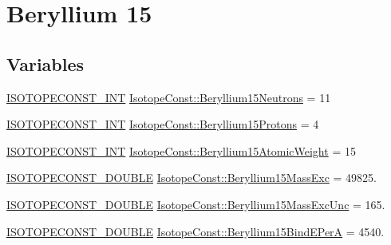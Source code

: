 \hypertarget{group___isotope_const-_beryllium-_be15}{}\section{Beryllium 15}
\label{group___isotope_const-_beryllium-_be15}
\subsection*{Variables}
\begin{DoxyCompactItemize}
\item 
\mbox{\hyperlink{group___isotope_const-_macros_ga5f18360b3e99483a35c32d789e62621c}{I\+S\+O\+T\+O\+P\+E\+C\+O\+N\+S\+T\+\_\+\+I\+NT}} \mbox{\hyperlink{group___isotope_const-_beryllium-_be15_ga1533d6149188ed36e13603113fab02f1}{Isotope\+Const\+::\+Beryllium15\+Neutrons}} = 11
\item 
\mbox{\hyperlink{group___isotope_const-_macros_ga5f18360b3e99483a35c32d789e62621c}{I\+S\+O\+T\+O\+P\+E\+C\+O\+N\+S\+T\+\_\+\+I\+NT}} \mbox{\hyperlink{group___isotope_const-_beryllium-_be15_ga3765d63df0bcdcb15f79ee29c2722708}{Isotope\+Const\+::\+Beryllium15\+Protons}} = 4
\item 
\mbox{\hyperlink{group___isotope_const-_macros_ga5f18360b3e99483a35c32d789e62621c}{I\+S\+O\+T\+O\+P\+E\+C\+O\+N\+S\+T\+\_\+\+I\+NT}} \mbox{\hyperlink{group___isotope_const-_beryllium-_be15_ga7719b76e11f25e472c402c6cccddc75c}{Isotope\+Const\+::\+Beryllium15\+Atomic\+Weight}} = 15
\item 
\mbox{\hyperlink{group___isotope_const-_macros_ga8f45a7272ce02c0b4c65c44636ed719a}{I\+S\+O\+T\+O\+P\+E\+C\+O\+N\+S\+T\+\_\+\+D\+O\+U\+B\+LE}} \mbox{\hyperlink{group___isotope_const-_beryllium-_be15_ga628077eef6088a071adda57e8fd1081f}{Isotope\+Const\+::\+Beryllium15\+Mass\+Exc}} = 49825.
\item 
\mbox{\hyperlink{group___isotope_const-_macros_ga8f45a7272ce02c0b4c65c44636ed719a}{I\+S\+O\+T\+O\+P\+E\+C\+O\+N\+S\+T\+\_\+\+D\+O\+U\+B\+LE}} \mbox{\hyperlink{group___isotope_const-_beryllium-_be15_ga3bc043eafafe12fd75c0561aeb61da6d}{Isotope\+Const\+::\+Beryllium15\+Mass\+Exc\+Unc}} = 165.
\item 
\mbox{\hyperlink{group___isotope_const-_macros_ga8f45a7272ce02c0b4c65c44636ed719a}{I\+S\+O\+T\+O\+P\+E\+C\+O\+N\+S\+T\+\_\+\+D\+O\+U\+B\+LE}} \mbox{\hyperlink{group___isotope_const-_beryllium-_be15_ga525240af047a38d6ec482bec282ebc85}{Isotope\+Const\+::\+Beryllium15\+Bind\+E\+PerA}} = 4540.
\item 

\end{DoxyCompactItemize}
